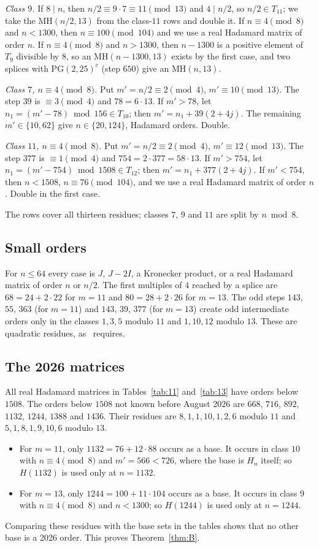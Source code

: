\documentclass[10pt]{article}
\theoremstyle{remark}
\newcommand{\MH}{\mathrm{MH}}
\newcommand{\PG}{\mathrm{PG}}
\begin{document}
\emph{Class $9$.} If $8\mid n$, then $n/2\equiv9\cdot7\equiv11\pmod{13}$ and $4\mid n/2$, so $n/2\in T_{11}$; we take the $\MH(n/2,13)$ from the class-$11$ rows and double it. If $n\equiv4\pmod8$ and $n<1300$, then $n\equiv100\pmod{104}$ and we use a real Hadamard matrix of order $n$. If $n\equiv4\pmod8$ and $n>1300$, then $n-1300$ is a positive element of $T_9$ divisible by $8$, so an $\MH(n-1300,13)$ exists by the first case, and two splices with $\PG(2,25)^c$ (step $650$) give an $\MH(n,13)$.

\emph{Class $7$, $n\equiv4\pmod8$.} Put $m'=n/2\equiv2\pmod4$, $m'\equiv10\pmod{13}$. The step $39$ is $\equiv3\pmod4$ and $78=6\cdot13$. If $m'>78$, let $n_1=(m'-78)\bmod156\in T_{10}$; then $m'=n_1+39(2+4j)$. The remaining $m'\in\{10,62\}$ give $n\in\{20,124\}$, Hadamard orders. Double.

\emph{Class $11$, $n\equiv4\pmod8$.} Put $m'=n/2\equiv2\pmod4$, $m'\equiv12\pmod{13}$. The step $377$ is $\equiv1\pmod4$ and $754=2\cdot377=58\cdot13$. If $m'>754$, let $n_1=(m'-754)\bmod1508\in T_{12}$; then $m'=n_1+377(2+4j)$. If $m'<754$, then $n<1508$, $n\equiv76\pmod{104}$, and we use a real Hadamard matrix of order $n$. Double in the first case.

The rows cover all thirteen residues; classes $7$, $9$ and $11$ are split by $n\bmod8$.

\subsection{Small orders}
For $n\le64$ every case is $J$, $J-2I$, a Kronecker product, or a real Hadamard matrix of order $n$ or $n/2$. The first multiples of $4$ reached by a splice are $68=24+2\cdot22$ for $m=11$ and $80=28+2\cdot26$ for $m=13$. The odd steps $143$, $55$, $363$ (for $m=11$) and $143$, $39$, $377$ (for $m=13$) create odd intermediate orders only in the classes $1,3,5$ modulo $11$ and $1,10,12$ modulo $13$. These are quadratic residues, as~\cite[Lemma~2.2]{K} requires.

\subsection{The 2026 matrices}
All real Hadamard matrices in Tables~\ref{tab:11} and~\ref{tab:13} have orders below $1508$. The orders below $1508$ not known before August 2026 are $668$, $716$, $892$, $1132$, $1244$, $1388$ and $1436$. Their residues are $8,1,1,10,1,2,6$ modulo $11$ and $5,1,8,1,9,10,6$ modulo $13$.
\begin{itemize}
\item For $m=11$, only $1132=76+12\cdot88$ occurs as a base. It occurs in class $10$ with $n\equiv4\pmod8$ and $m'=566<726$, where the base is $H_n$ itself; so $H(1132)$ is used only at $n=1132$.
\item For $m=13$, only $1244=100+11\cdot104$ occurs as a base. It occurs in class $9$ with $n\equiv4\pmod8$ and $n<1300$; so $H(1244)$ is used only at $n=1244$.
\end{itemize}
Comparing these residues with the base sets in the tables shows that no other base is a 2026 order. This proves Theorem~\ref{thm:B}.
\end{document}
